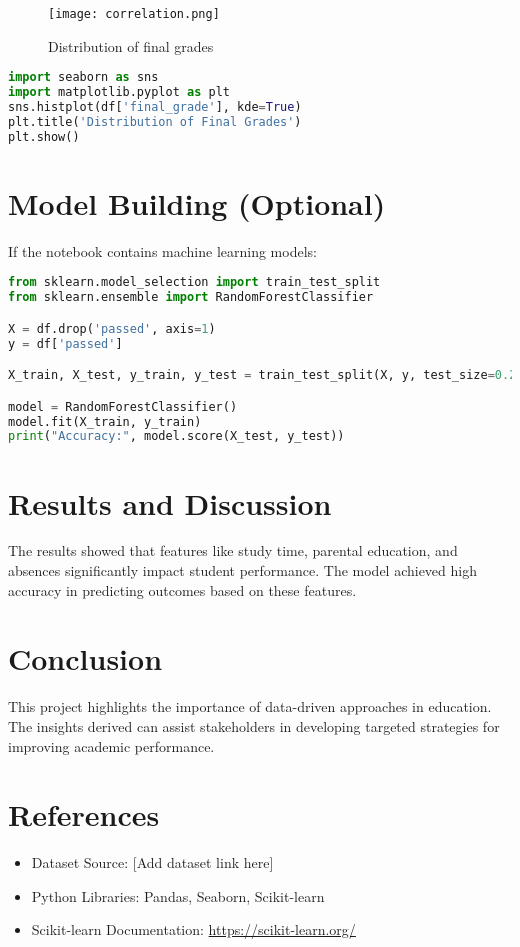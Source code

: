 \documentclass[12pt]{article}
\begin{document}
\begin{figure}[H]
    \centering
    \texttt{[image: correlation.png]}
    \caption{Distribution of final grades}
\end{figure}

\begin{lstlisting}[language=Python, caption=EDA Sample Code]
import seaborn as sns
import matplotlib.pyplot as plt
sns.histplot(df['final_grade'], kde=True)
plt.title('Distribution of Final Grades')
plt.show()
\end{lstlisting}

\section{Model Building (Optional)}
If the notebook contains machine learning models:

\begin{lstlisting}[language=Python, caption=Model Training Example]
from sklearn.model_selection import train_test_split
from sklearn.ensemble import RandomForestClassifier

X = df.drop('passed', axis=1)
y = df['passed']

X_train, X_test, y_train, y_test = train_test_split(X, y, test_size=0.2)

model = RandomForestClassifier()
model.fit(X_train, y_train)
print("Accuracy:", model.score(X_test, y_test))
\end{lstlisting}

\section{Results and Discussion}
The results showed that features like study time, parental education, and absences significantly impact student performance. The model achieved high accuracy in predicting outcomes based on these features.

\section{Conclusion}
This project highlights the importance of data-driven approaches in education. The insights derived can assist stakeholders in developing targeted strategies for improving academic performance.

\section{References}
\begin{itemize}
    \item Dataset Source: [Add dataset link here]
    \item Python Libraries: Pandas, Seaborn, Scikit-learn
    \item Scikit-learn Documentation: \url{https://scikit-learn.org/}
\end{itemize}
\end{document}
